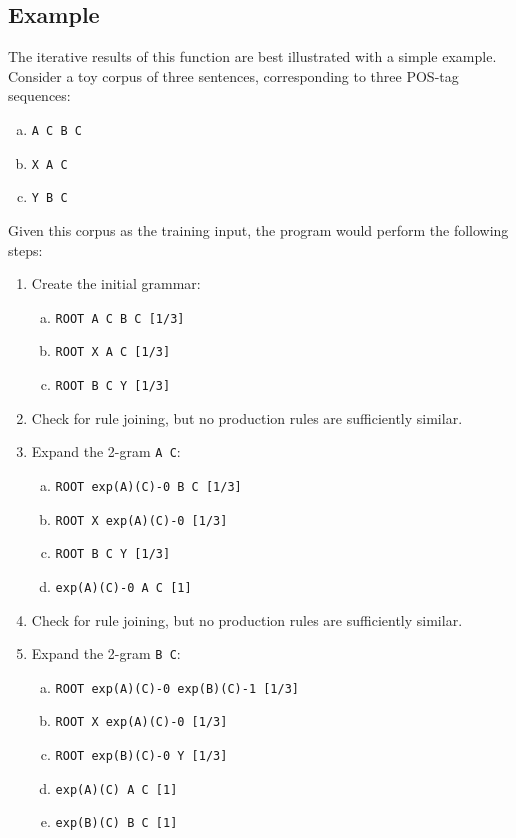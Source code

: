 \documentclass[paper=a4, fontsize=11pt]{scrartcl} %
\numberwithin{equation}{section} %
\numberwithin{figure}{section} %
\numberwithin{table}{section} %
\begin{document}
\subsection{Example}

The iterative results of this function are best illustrated with a simple example. Consider a toy corpus of three sentences, corresponding to three POS-tag sequences:

\begin{enumerate}[(a)]
\item \texttt{A C B C}
\item \texttt{X A C}
\item \texttt{Y B C}
\end{enumerate}

Given this corpus as the training input, the program would perform the following steps:
\begin{enumerate}[1.]
\item Create the initial grammar:
\begin{enumerate}[(a)]
\item \texttt{ROOT \textrightarrow A C B C [1/3]}
\item \texttt{ROOT \textrightarrow X A C [1/3]}
\item \texttt{ROOT \textrightarrow B C Y [1/3]}
\end{enumerate}

\item Check for rule joining, but no production rules are sufficiently similar.

\item Expand the 2-gram \texttt{A C}:
\begin{enumerate}[(a)]
\item \texttt{ROOT \textrightarrow exp(A)(C)-0 B C [1/3]}
\item \texttt{ROOT \textrightarrow X exp(A)(C)-0 [1/3]}
\item \texttt{ROOT \textrightarrow B C Y [1/3]}
\item \texttt{exp(A)(C)-0 \textrightarrow A C  [1]}
\end{enumerate}

\item Check for rule joining, but no production rules are sufficiently similar.

\item Expand the 2-gram \texttt{B C}:
\begin{enumerate}[(a)]
\item \texttt{ROOT \textrightarrow exp(A)(C)-0 exp(B)(C)-1 [1/3]}
\item \texttt{ROOT \textrightarrow X exp(A)(C)-0 [1/3]}
\item \texttt{ROOT \textrightarrow exp(B)(C)-0 Y [1/3]}
\item \texttt{exp(A)(C) \textrightarrow A C  [1]}
\item \texttt{exp(B)(C) \textrightarrow B C  [1]}
\end{enumerate}


\end{enumerate}
\end{document}
